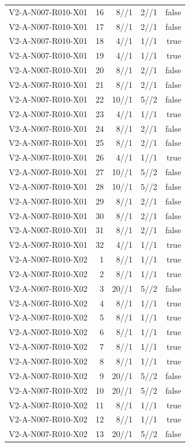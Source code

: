 {\begin{longtable}{lrrrr}
V2-A-N007-R010-X01 & 16 & 8//1 & 2//1 & false \\
V2-A-N007-R010-X01 & 17 & 8//1 & 2//1 & false \\
V2-A-N007-R010-X01 & 18 & 4//1 & 1//1 & true \\
V2-A-N007-R010-X01 & 19 & 4//1 & 1//1 & true \\
V2-A-N007-R010-X01 & 20 & 8//1 & 2//1 & false \\
V2-A-N007-R010-X01 & 21 & 8//1 & 2//1 & false \\
V2-A-N007-R010-X01 & 22 & 10//1 & 5//2 & false \\
V2-A-N007-R010-X01 & 23 & 4//1 & 1//1 & true \\
V2-A-N007-R010-X01 & 24 & 8//1 & 2//1 & false \\
V2-A-N007-R010-X01 & 25 & 8//1 & 2//1 & false \\
V2-A-N007-R010-X01 & 26 & 4//1 & 1//1 & true \\
V2-A-N007-R010-X01 & 27 & 10//1 & 5//2 & false \\
V2-A-N007-R010-X01 & 28 & 10//1 & 5//2 & false \\
V2-A-N007-R010-X01 & 29 & 8//1 & 2//1 & false \\
V2-A-N007-R010-X01 & 30 & 8//1 & 2//1 & false \\
V2-A-N007-R010-X01 & 31 & 8//1 & 2//1 & false \\
V2-A-N007-R010-X01 & 32 & 4//1 & 1//1 & true \\
V2-A-N007-R010-X02 & 1 & 8//1 & 1//1 & true \\
V2-A-N007-R010-X02 & 2 & 8//1 & 1//1 & true \\
V2-A-N007-R010-X02 & 3 & 20//1 & 5//2 & false \\
V2-A-N007-R010-X02 & 4 & 8//1 & 1//1 & true \\
V2-A-N007-R010-X02 & 5 & 8//1 & 1//1 & true \\
V2-A-N007-R010-X02 & 6 & 8//1 & 1//1 & true \\
V2-A-N007-R010-X02 & 7 & 8//1 & 1//1 & true \\
V2-A-N007-R010-X02 & 8 & 8//1 & 1//1 & true \\
V2-A-N007-R010-X02 & 9 & 20//1 & 5//2 & false \\
V2-A-N007-R010-X02 & 10 & 20//1 & 5//2 & false \\
V2-A-N007-R010-X02 & 11 & 8//1 & 1//1 & true \\
V2-A-N007-R010-X02 & 12 & 8//1 & 1//1 & true \\
V2-A-N007-R010-X02 & 13 & 20//1 & 5//2 & false \\

\end{longtable}}
